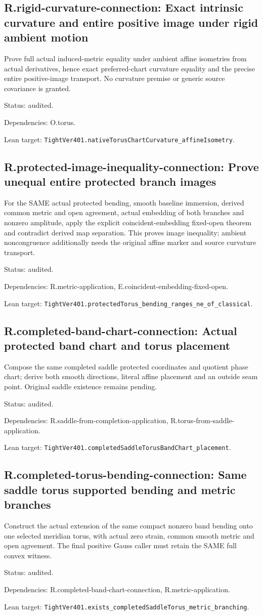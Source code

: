 \documentclass{article}
\begin{document}
\subsection*{R.rigid-curvature-connection: Exact intrinsic curvature and entire positive image under rigid ambient motion}
Prove full actual induced-metric equality under ambient affine isometries from actual derivatives, hence exact preferred-chart curvature equality and the precise entire positive-image transport. No curvature premise or generic source covariance is granted.
\par Status: audited.
\par Dependencies: O.torus.
\par Lean target: \texttt{TightVer401.nativeTorusChartCurvature\_affineIsometry}.
\subsection*{R.protected-image-inequality-connection: Prove unequal entire protected branch images}
For the SAME actual protected bending, smooth baseline immersion, derived common metric and open agreement, actual embedding of both branches and nonzero amplitude, apply the explicit coincident-embedding fixed-open theorem and contradict derived map separation. This proves image inequality; ambient noncongruence additionally needs the original affine marker and source curvature transport.
\par Status: audited.
\par Dependencies: R.metric-application, E.coincident-embedding-fixed-open.
\par Lean target: \texttt{TightVer401.protectedTorus\_bending\_ranges\_ne\_of\_classical}.
\subsection*{R.completed-band-chart-connection: Actual protected band chart and torus placement}
Compose the same completed saddle protected coordinates and quotient phase chart; derive both smooth directions, literal affine placement and an outside seam point. Original saddle existence remains pending.
\par Status: audited.
\par Dependencies: R.saddle-from-completion-application, R.torus-from-saddle-application.
\par Lean target: \texttt{TightVer401.completedSaddleTorusBandChart\_placement}.
\subsection*{R.completed-torus-bending-connection: Same saddle torus supported bending and metric branches}
Construct the actual extension of the same compact nonzero band bending onto one selected meridian torus, with actual zero strain, common smooth metric and open agreement. The final positive Gauss caller must retain the SAME full convex witness.
\par Status: audited.
\par Dependencies: R.completed-band-chart-connection, R.metric-application.
\par Lean target: \texttt{TightVer401.exists\_completedSaddleTorus\_metric\_branching}.
\end{document}
